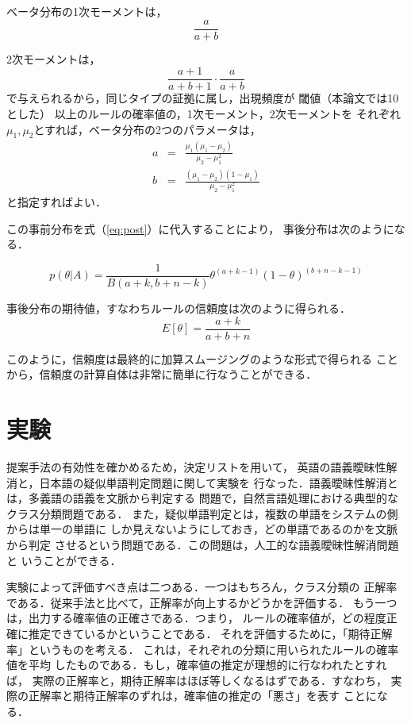 ベータ分布の1次モーメントは，
\begin{equation}
\frac{a}{a + b}
\end{equation}

2次モーメントは，
\begin{equation}
\frac{a+1}{a + b + 1} \cdot \frac{a}{a+b}
\end{equation}
で与えられるから，同じタイプの証拠に属し，出現頻度が
閾値（本論文では10とした）
以上のルールの確率値の，1次モーメント，2次モーメントを
それぞれ $\mu_1,\mu_2$とすれば，ベータ分布の2つのパラメータは，
\begin{eqnarray}
a &=& \frac{\mu_1(\mu_1 - \mu_2)}{\mu_2 - \mu_1^2} \\
b &=& \frac{(\mu_1 - \mu_2)(1 - \mu_1)}{\mu_2 - \mu_1^2}
\end{eqnarray}
と指定すればよい．


この事前分布を式（\ref{eq:post}）に代入することにより，
事後分布は次のようになる．

\begin{equation}
p(\theta|A) = \frac{1}{B(a+k, b+n-k)}\theta^{(a+k-1)}(1-\theta)^{(b+n-k-1)}
\end{equation}

事後分布の期待値，すなわちルールの信頼度は次のように得られる．
\begin{equation}
	E[\theta] = \frac{a+k}{a+b+n}
\end{equation}

このように，信頼度は最終的に加算スムージングのような形式で得られる
ことから，信頼度の計算自体は非常に簡単に行なうことができる．
\vspace{-2pt}
\section{実験 \label{sc:experiments}}

提案手法の有効性を確かめるため，決定リストを用いて，
英語の語義曖昧性解消と，日本語の疑似単語判定問題に関して実験を
行なった．語義曖昧性解消とは，多義語の語義を文脈から判定する
問題で，自然言語処理における典型的なクラス分類問題である．
また，疑似単語判定とは，複数の単語をシステムの側からは単一の単語に
しか見えないようにしておき，どの単語であるのかを文脈から判定
させるという問題である．この問題は，人工的な語義曖昧性解消問題と
いうことができる．

実験によって評価すべき点は二つある．一つはもちろん，クラス分類の
正解率である．従来手法と比べて，正解率が向上するかどうかを評価する．
もう一つは，出力する確率値の正確さである．つまり，
ルールの確率値が，どの程度正確に推定できているかということである．
それを評価するために，「期待正解率」というものを考える．
これは，それぞれの分類に用いられたルールの確率値を平均
したものである．もし，確率値の推定が理想的に行なわれたとすれば，
実際の正解率と，期待正解率はほぼ等しくなるはずである．すなわち，
実際の正解率と期待正解率のずれは，確率値の推定の「悪さ」を表す
ことになる．


